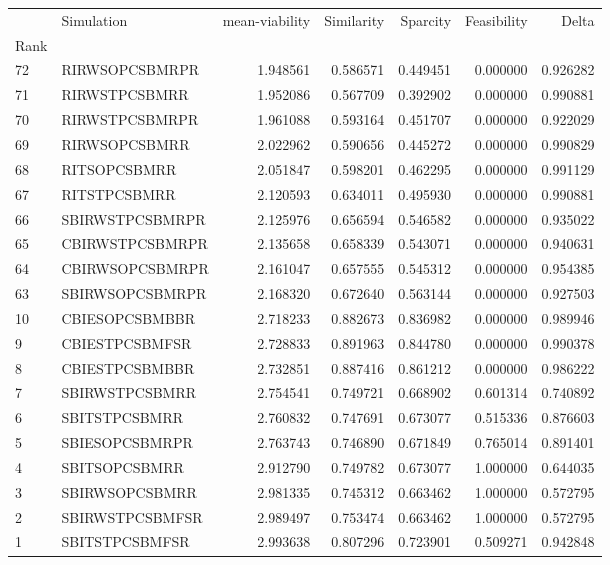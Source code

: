 \begin{tabular}{llrrrrr}
 & Simulation & mean-viability & Similarity & Sparcity & Feasibility & Delta \\
Rank &  &  &  &  &  &  \\
72 & RI\-RWS\-OPC\-SBM\-RPR & 1.948561 & 0.586571 & 0.449451 & 0.000000 & 0.926282 \\
71 & RI\-RWS\-TPC\-SBM\-RR & 1.952086 & 0.567709 & 0.392902 & 0.000000 & 0.990881 \\
70 & RI\-RWS\-TPC\-SBM\-RPR & 1.961088 & 0.593164 & 0.451707 & 0.000000 & 0.922029 \\
69 & RI\-RWS\-OPC\-SBM\-RR & 2.022962 & 0.590656 & 0.445272 & 0.000000 & 0.990829 \\
68 & RI\-TS\-OPC\-SBM\-RR & 2.051847 & 0.598201 & 0.462295 & 0.000000 & 0.991129 \\
67 & RI\-TS\-TPC\-SBM\-RR & 2.120593 & 0.634011 & 0.495930 & 0.000000 & 0.990881 \\
66 & SBI\-RWS\-TPC\-SBM\-RPR & 2.125976 & 0.656594 & 0.546582 & 0.000000 & 0.935022 \\
65 & CBI\-RWS\-TPC\-SBM\-RPR & 2.135658 & 0.658339 & 0.543071 & 0.000000 & 0.940631 \\
64 & CBI\-RWS\-OPC\-SBM\-RPR & 2.161047 & 0.657555 & 0.545312 & 0.000000 & 0.954385 \\
63 & SBI\-RWS\-OPC\-SBM\-RPR & 2.168320 & 0.672640 & 0.563144 & 0.000000 & 0.927503 \\
10 & CBI\-ES\-OPC\-SBM\-BBR & 2.718233 & 0.882673 & 0.836982 & 0.000000 & 0.989946 \\
9 & CBI\-ES\-TPC\-SBM\-FSR & 2.728833 & 0.891963 & 0.844780 & 0.000000 & 0.990378 \\
8 & CBI\-ES\-TPC\-SBM\-BBR & 2.732851 & 0.887416 & 0.861212 & 0.000000 & 0.986222 \\
7 & SBI\-RWS\-TPC\-SBM\-RR & 2.754541 & 0.749721 & 0.668902 & 0.601314 & 0.740892 \\
6 & SBI\-TS\-TPC\-SBM\-RR & 2.760832 & 0.747691 & 0.673077 & 0.515336 & 0.876603 \\
5 & SBI\-ES\-OPC\-SBM\-RPR & 2.763743 & 0.746890 & 0.671849 & 0.765014 & 0.891401 \\
4 & SBI\-TS\-OPC\-SBM\-RR & 2.912790 & 0.749782 & 0.673077 & 1.000000 & 0.644035 \\
3 & SBI\-RWS\-OPC\-SBM\-RR & 2.981335 & 0.745312 & 0.663462 & 1.000000 & 0.572795 \\
2 & SBI\-RWS\-TPC\-SBM\-FSR & 2.989497 & 0.753474 & 0.663462 & 1.000000 & 0.572795 \\
1 & SBI\-TS\-TPC\-SBM\-FSR & 2.993638 & 0.807296 & 0.723901 & 0.509271 & 0.942848 \\
\end{tabular}
